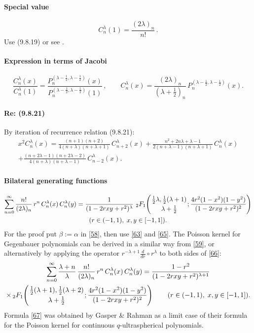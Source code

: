 \documentclass[twoside,11pt]{article}
\newcommand\al\alpha
\newcommand\be\beta
\newcommand\la\lambda
\newcommand\half{\frac12}
\newcommand\thalf{\tfrac12}
\newcommand\iy\infty
\newcommand{\hyp}[5]{\,\mbox{}_{#1}F_{#2}\!\left(
  \genfrac{}{}{0pt}{}{#3}{#4};#5\right)}
\begin{document}
\paragraph{Special value}
\begin{equation}
C_n^{\la}(1)=\frac{(2\la)_n}{n!}\,.
\label{49}
\end{equation}
Use (9.8.19) or see .
%
\paragraph{Expression in terms of Jacobi}
%
\begin{equation}
\frac{C_n^\la(x)}{C_n^\la(1)}=
\frac{P_n^{(\la-\half,\la-\half)}(x)}{P_n^{(\la-\half,\la-\half)}(1)}\,,\qquad
C_n^\la(x)=\frac{(2\la)_n}{(\la+\thalf)_n}\,P_n^{(\la-\half,\la-\half)}(x).
\label{65}
\end{equation}
%
\paragraph{Re: (9.8.21)}
By iteration of recurrence relation (9.8.21):
\begin{multline}
x^2 C_n^\la(x)=
\frac{(n+1)(n+2)}{4(n+\la)(n+\la+1)}\,C_{n+2}^\la(x)+
\frac{n^2+2n\la+\la-1}{2(n+\la-1)(n+\la+1)}\,C_n^\la(x)\\
+\frac{(n+2\la-1)(n+2\la-2)}{4(n+\la)(n+\la-1)}\,C_{n-2}^\la(x).
\label{6}
\end{multline}
%
\paragraph{Bilateral generating functions}
\begin{multline}
\sum_{n=0}^\iy\frac{n!}{(2\la)_n}\,r^n\,C_n^\la(x)\,C_n^\la(y)
=\frac1{(1-2rxy+r^2)^\la}\,\hyp21{\thalf\la,\thalf(\la+1)}{\la+\thalf}
{\frac{4r^2(1-x^2)(1-y^2)}{(1-2rxy+r^2)^2}}\\
(r\in(-1,1),\;x,y\in[-1,1]).
\label{66}
\end{multline}
For the proof put $\be:=\al$ in \eqref{58}, then use \eqref{63} and \eqref{65}.
The Poisson kernel for Gegenbauer polynomials can be derived in a similar way
from \eqref{59}, or alternatively by applying the operator
$r^{-\la+1}\frac d{dr}\circ r^\la$ to both sides of \eqref{66}:
\begin{multline}
\sum_{n=0}^\iy\frac{\la+n}\la\,\frac{n!}{(2\la)_n}\,r^n\,C_n^\la(x)\,C_n^\la(y)
=\frac{1-r^2}{(1-2rxy+r^2)^{\la+1}}\\
\times\hyp21{\thalf(\la+1),\thalf(\la+2)}{\la+\thalf}
{\frac{4r^2(1-x^2)(1-y^2)}{(1-2rxy+r^2)^2}}\qquad
(r\in(-1,1),\;x,y\in[-1,1]).
\label{67}
\end{multline}
Formula \eqref{67} was obtained by Gasper \& Rahman 
as a limit case of their formula for the Poisson kernel for continuous
$q$-ultraspherical polynomials.
%
\end{document}

